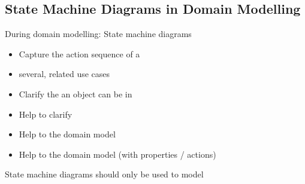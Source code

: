 \subsection{State Machine Diagrams in Domain Modelling}
\begin{defBox}
    During domain modelling: State machine diagrams 
\end{defBox}
\begin{defBox}[title=Uses of State Machine Diagrams in Doamin Modelling]
    \begin{itemize}
        \item Capture the action sequence of a 
        \item {} several, related use cases
        \item Clarify the  an object can be in
        \item Help to clarify 
        \item Help to  the domain model
        \item Help to  the domain model (with properties / actions)
    \end{itemize}
    State machine diagrams should only be used to model 
\end{defBox}